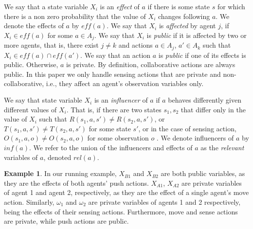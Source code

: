 \documentclass[letterpaper]{article}
\theoremstyle{definition}
\newtheorem{example}{Example}
\newcommand{\eliran}[1]{\textbf{[\color{red}ELIRAN:#1]}}
\newcommand{\ronen}[1]{\textbf{[\color{blue}RONEN:#1]}}
\newcommand{\guy}[1]{\textbf{[\color{orange}GUY:#1]}}
\newcommand{\eff}{\mathit{eff}}
\newcommand{\rel}{\mathit{rel}}
\newcommand{\infl}{\mathit{inf}}
\begin{document}
We say that a state variable $X_i$ is an {\em effect} of $a$ if there is some state $s$ for which there is a non zero probability that the value of $X_i$ changes following $a$. We denote the effects of $a$ by $\eff(a)$. We say that $X_i$ is \emph{affected} by agent $j$, if  $X_i\in\eff(a)$ for some  $a\in A_j$.
We say that $X_i$ is \emph{public} if it is affected by two or more agents, that is, there exist $j\neq k$ and actions $a\in A_j$, $a'\in A_k$ such that $X_i\in \eff(a) \cap \eff(a')$.
We say that an action $a$ is \emph{public} if one of its effects is public. Otherwise, $a$ is private.
By definition, collaborative actions are always public. In this paper we only handle sensing actions that are private and non-collaborative, i.e., they affect an agent's observation variables only.

We say that state variable $X_i$ is an
{\em influencer} of $a$ if $a$ behaves differently given different values of $X_i$.
That is, if there are two states $s_1,s_2$ that differ only in the value of $X_i$ such that $R(s_1,a,s')\neq R(s_2,a,s')$, or $T(s_1,a,s')\neq T(s_2,a,s')$ for some state $s'$, or in the case of sensing action, $O(s_1,a,o)\neq O(s_2,a,o)$ for some observation $o$ .
We denote influencers of $a$ by $\infl(a)$.
%
We refer to the union of the influencers and effects of $a$ as
the {\em relevant} variables of $a$,
denoted $\rel(a)$. 


\begin{example}
In our running example, $X_{B1}$ and $X_{B2}$ are both public variables, as they are the effects of both agents' push actions.
$X_{A1}$, $X_{A2}$ are private variables of agent 1 and agent 2, respectively, as they are the effect of a single agent's move action.
Similarly, $\omega_1$ and $\omega_2$ are private variables of agents 1 and 2 respectively, being the effects of their sensing actions.
Furthermore, move and sense actions are private, while push actions are public.
\end{example}
\end{document}
